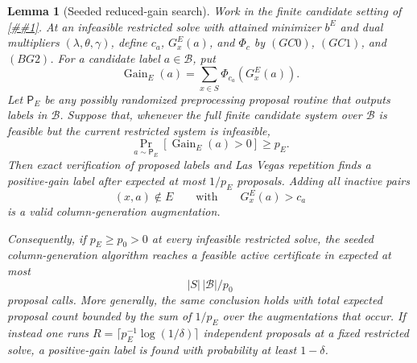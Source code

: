 \documentclass[10pt]{article}
\newcommand{\cref}[1]{\ref{##1}}
\newtheorem{lemma}[theorem]{Lemma}
\theoremstyle{definition}
\begin{document}
\begin{lemma}[Seeded reduced-gain search]
   \label{lem:seeded-reduced-gain-search}
   Work in the finite candidate setting of
   \cref{lem:finite-rate-coverage-column-generation}.  At an infeasible
   restricted solve with attained minimizer \(b^E\) and dual multipliers
   \((\lambda,\theta,\gamma)\), define \(c_a\), \(G_x^E(a)\), and
   \(\Phi_c\) by \((GC0)\), \((GC1)\), and \((BG2)\).  For a candidate label
   \(a\in\mathcal B\), put
   \[
      \operatorname{Gain}_E(a)
      =
      \sum_{x\in S}\Phi_{c_a}\!\left(G_x^E(a)\right).
      \tag{SG1}
   \]
   Let \(\mathsf P_E\) be any possibly randomized preprocessing proposal
   routine that outputs labels in \(\mathcal B\).  Suppose that, whenever the
   full finite candidate system over \(\mathcal B\) is feasible but the current
   restricted system is infeasible,
   \[
      \Pr_{a\sim\mathsf P_E}\!\left[
         \operatorname{Gain}_E(a)>0
      \right]\ge p_E .
      \tag{SG2}
   \]
   Then exact verification of proposed labels and Las Vegas repetition finds a
   positive-gain label after expected at most \(1/p_E\) proposals.  Adding all
   inactive pairs
   \[
      (x,a)\notin E
      \qquad\text{with}\qquad
      G_x^E(a)>c_a
      \tag{SG3}
   \]
   is a valid column-generation augmentation.

   Consequently, if \(p_E\ge p_0>0\) at every infeasible restricted solve, the
   seeded column-generation algorithm reaches a feasible active certificate in
   expected at most
   \[
      |S|\,|\mathcal B|/p_0
   \]
   proposal calls.  More generally, the same conclusion holds with total
   expected proposal count bounded by the sum of \(1/p_E\) over the
   augmentations that occur.  If instead one runs
   \(R=\lceil p_E^{-1}\log(1/\delta)\rceil\) independent proposals at a fixed
   restricted solve, a positive-gain label is found with probability at least
   \(1-\delta\).
\end{lemma}
\end{document}
